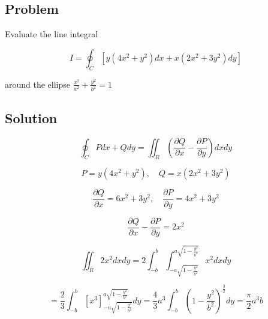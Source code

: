 \documentclass[12pt]{article}
\begin{document}
\subsection{Problem}

Evaluate the line integral

\[
    I=\oint_C\left[y\left(4 x^2+y^2\right) d x+x\left(2 x^2+3 y^2\right) d y\right]
\]

around the ellipse \(\frac{x^2}{a^2}+\frac{y^2}{b^2}=1\)

\subsection{Solution}

\[
    \oint_C P d x+Q d y=\iint_R\left(\frac{\partial Q}{\partial x}-\frac{\partial P}{\partial y}\right) d x d y
\]

\[
    P = y\left(4 x^2+y^2\right), \quad Q = x\left(2 x^2+3 y^2\right)
\]

\[
    \frac{\partial Q}{\partial x} = 6x^2 + 3 y^2, \quad \frac{\partial P}{\partial y} = 4 x^2 + 3 y^2
\]

\[
    \frac{\partial Q}{\partial x} - \frac{\partial P}{\partial y} = 2 x^2
\]

\[
    \iint_R 2 x^2 d x d y
    = 2 \int_{-b}^{b} \int_{-a \sqrt{1 - \frac{y^2}{b^2}}}^{a \sqrt{1 - \frac{y^2}{b^2}}} x^2 d x d y
\]

\[
    = \frac{2}{3} \int_{-b}^{b} {\left[ x^3 \right]}_{-a \sqrt{1 - \frac{y^2}{b^2}}}^{a \sqrt{1 - \frac{y^2}{b^2}}} d y
    = \frac{4}{3} a^3 \int_{-b}^{b} {\left(1 - \frac{y^2}{b^2}\right) }^\frac{3}{2} d y
    = \frac{\pi}{2} a^3 b
\]

\newpage


\nocite{El-Deeb_PEU-218_Assignments}
\end{document}
